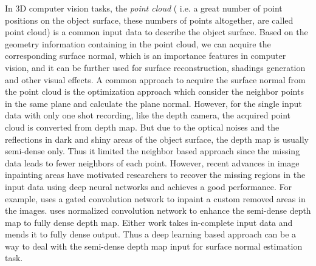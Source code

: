 %
%
%

In 3D computer vision tasks, the \textit{point cloud} ( i.e. a great number of point positions on the object surface, these numbers of points altogether, are called point cloud) is a common input data to describe the object surface. Based on the geometry information containing in the point cloud, we can acquire the corresponding surface normal, which is an importance features in computer vision, and it can be further used for surface reconstruction, shadings generation and other visual effects. A common approach to acquire the surface normal from the point cloud is the optimization approach which consider the neighbor points in the same plane and calculate the plane normal. However, for the single input data with only one shot recording, like the depth camera, the acquired point cloud is converted from depth map. But due to the optical noises and the reflections in dark and shiny areas of the object surface, the depth map is usually semi-dense only. Thus it limited the neighbor based approach since the missing data leads to fewer neighbors of each point. However, recent advances in image inpainting areas have motivated researchers to recover the missing regions in the input data using deep neural networks and achieves a good performance. For example, \cite{gconv} uses a gated convolution network to inpaint a custom removed areas in the images. \cite{nconv} uses normalized convolution network to enhance the semi-dense depth map to fully dense depth map. Either work takes in-complete input data and mends it to fully dense output. Thus a deep learning based approach can be a way to deal with the semi-dense depth map input for surface normal estimation task.

